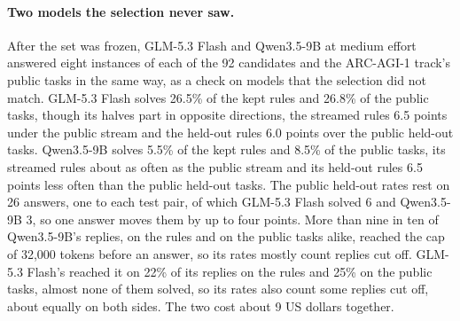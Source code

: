 \paragraph{Two models the selection never saw.} After the set was frozen, GLM-5.3 Flash and Qwen3.5-9B at medium effort answered eight instances of each of the 92 candidates and the ARC-AGI-1 track's public tasks in the same way, as a check on models that the selection did not match. GLM-5.3 Flash solves 26.5\% of the kept rules and 26.8\% of the public tasks, though its halves part in opposite directions, the streamed rules 6.5 points under the public stream and the held-out rules 6.0 points over the public held-out tasks. Qwen3.5-9B solves 5.5\% of the kept rules and 8.5\% of the public tasks, its streamed rules about as often as the public stream and its held-out rules 6.5 points less often than the public held-out tasks. The public held-out rates rest on 26 answers, one to each test pair, of which GLM-5.3 Flash solved 6 and Qwen3.5-9B 3, so one answer moves them by up to four points. More than nine in ten of Qwen3.5-9B's replies, on the rules and on the public tasks alike, reached the cap of 32{,}000 tokens before an answer, so its rates mostly count replies cut off. GLM-5.3 Flash's reached it on 22\% of its replies on the rules and 25\% on the public tasks, almost none of them solved, so its rates also count some replies cut off, about equally on both sides. The two cost about 9 US dollars together.

\begin{table}[htbp]
\centering
\small\setlength{\tabcolsep}{5pt}

\caption{First-sight solve rates, in percent, on the private set and on the ARC-AGI-1 track's public tasks, measured the same way: three demonstrations, one answer and an exact match. Private columns are the 25 streamed rules, the 25 held-out rules and the 50 kept; public columns are the track's 25 stream tasks, its 25 held-out ARC-AGI-1 evaluation tasks and all 50. Calibrated is all 92 candidates that passed the filters and screens. Each rate is a mean over rules or tasks, of eight instances per rule or stream task for GPT-6 Luna, GLM-5.3 Flash and Qwen3.5-9B and four for Claude Opus 5.5. The selection matched the first four rows; the last two were calibrated after it.}
\label{tab:heldout}
\end{table}

